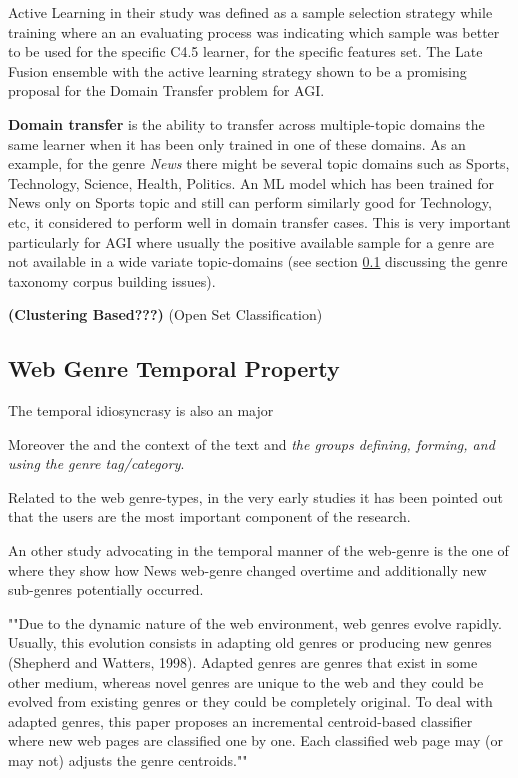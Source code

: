 Active Learning in their study was defined as a sample selection strategy while training where an an evaluating process was indicating which sample was better to be used for the specific C4.5 learner, for the specific features set. The Late Fusion ensemble with the active learning strategy shown to be a promising proposal for the Domain Transfer problem for AGI.

\textbf{Domain transfer} is the ability to transfer across multiple-topic domains the same learner when it has been only trained in one of these domains. As an example, for the genre \textit{News} there might be several topic domains such as Sports, Technology, Science, Health, Politics. An ML model which has been trained for News only on Sports topic and still can perform similarly good for Technology, etc, it considered to perform well in domain transfer cases. This is very important particularly for AGI where usually the positive available sample for a genre are not available in a wide variate topic-domains (see section \ref{} discussing the genre taxonomy corpus building issues).

\textbf{(Clustering Based???)}
(Open Set Classification)

\subsection{Web Genre Temporal Property}
The temporal idiosyncrasy is also an major  

Moreover the  and the context of the text and \textit{the groups defining, forming, and using the genre tag/category}.

Related to the web genre-types, in the very early studies it has been pointed out that the users are the most important component of the research. 

An other study advocating in the temporal manner of the web-genre is the one of  \parencite{caple2017genre} where they show how News web-genre changed overtime and additionally new sub-genres potentially occurred.


""Due to the dynamic nature of the web environment, web genres evolve rapidly. Usually,
this evolution consists in adapting old genres or producing new genres (Shepherd and
Watters, 1998). Adapted genres are genres that exist in some other medium, whereas novel
genres are unique to the web and they could be evolved from existing genres or they could
be completely original. To deal with adapted genres, this paper proposes an incremental
centroid-based classifier where new web pages are classified one by one. Each classified
web page may (or may not) adjusts the genre centroids.""






